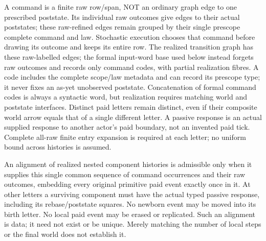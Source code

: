\documentclass[11pt]{article}
\begin{document}
A command is a finite raw row/span, NOT an ordinary graph edge to one prescribed poststate. Its individual raw outcomes give edges to their actual poststates; these raw-refined edges remain grouped by their single prescope complete command and law. Stochastic execution chooses that command before drawing its outcome and keeps its entire row. The realized transition graph has these raw-labelled edges; the formal input-word base used below instead forgets raw outcomes and records only command codes, with partial realization fibres. A code includes the complete scope/law metadata and can record its prescope type; it never fixes an as-yet unobserved poststate. Concatenation of formal command codes is always a syntactic word, but realization requires matching world and poststate interfaces. Distinct paid letters remain distinct, even if their composite world arrow equals that of a single different letter. A passive response is an actual supplied response to another actor's paid boundary, not an invented paid tick. Complete all-raw finite entry expansion is required at each letter; no uniform bound across histories is assumed.

An alignment of realized nested component histories is admissible only when it supplies this single common sequence of command occurrences and their raw outcomes, embedding every original primitive paid event exactly once in it. At other letters a surviving component must have the actual typed passive response, including its rebase/poststate squares. No newborn event may be moved into its birth letter. No local paid event may be erased or replicated. Such an alignment is data; it need not exist or be unique. Merely matching the number of local steps or the final world does not establish it.
\end{document}
